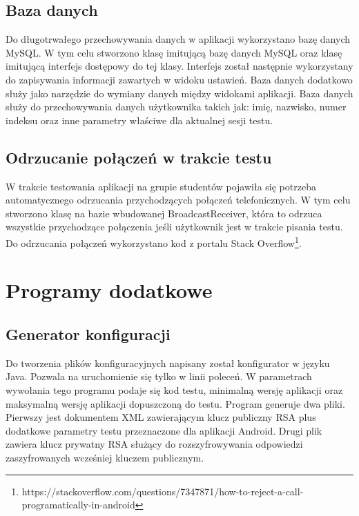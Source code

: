 \documentclass{report}
\begin{document}
			\subsection{Baza danych}
			
			Do długotrwałego przechowywania danych w aplikacji wykorzystano bazę danych MySQL. W tym celu stworzono klasę imitującą bazę danych MySQL oraz klasę imitującą interfejs dostępowy do tej klasy. Interfejs został następnie wykorzystany do zapisywania informacji zawartych w widoku ustawień. Baza danych dodatkowo służy jako narzędzie do wymiany danych między widokami aplikacji. Baza danych służy do przechowywania danych użytkownika takich jak: imię, nazwisko, numer indeksu oraz inne parametry właściwe dla aktualnej sesji testu. 
			
			\subsection{Odrzucanie połączeń w trakcie testu}
			
			W trakcie testowania aplikacji na grupie studentów pojawiła się potrzeba automatycznego odrzucania przychodzących połączeń telefonicznych. W tym celu stworzono klasę na bazie wbudowanej BroadcastReceiver, która to odrzuca wszystkie przychodzące połączenia jeśli użytkownik jest w trakcie pisania testu. Do odrzucania połączeń wykorzystano kod z portalu Stack Overflow\footnote{https://stackoverflow.com/questions/7347871/how-to-reject-a-call-programatically-in-android}.
			
		\section{Programy dodatkowe}
		
			\subsection{Generator konfiguracji}
			Do tworzenia plików konfiguracyjnych napisany został konfigurator w języku Java. Pozwala na uruchomienie się tylko w linii poleceń. W parametrach wywołania tego programu podaje się kod testu, minimalną wersję aplikacji oraz maksymalną wersję aplikacji dopuszczoną do testu. Program generuje dwa pliki. Pierwszy jest dokumentem XML zawierającym klucz publiczny RSA plus dodatkowe parametry testu przeznaczone dla aplikacji Android. Drugi plik zawiera klucz prywatny RSA służący do rozszyfrowywania odpowiedzi zaszyfrowanych wcześniej kluczem publicznym.
			
\end{document}
